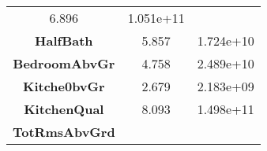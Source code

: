 \documentclass[]{article}
\begin{document}
\begin{longtable}[c]{@{}ccc@{}}
\begin{minipage}[t]{0.16\columnwidth}
6.896
\strut\end{minipage} &
\begin{minipage}[t]{0.19\columnwidth}\centering\strut
1.051e+11
\strut\end{minipage}\tabularnewline
\begin{minipage}[t]{0.25\columnwidth}\centering\strut
\textbf{HalfBath}
\strut\end{minipage} &
\begin{minipage}[t]{0.16\columnwidth}\centering\strut
5.857
\strut\end{minipage} &
\begin{minipage}[t]{0.19\columnwidth}\centering\strut
1.724e+10
\strut\end{minipage}\tabularnewline
\begin{minipage}[t]{0.25\columnwidth}\centering\strut
\textbf{BedroomAbvGr}
\strut\end{minipage} &
\begin{minipage}[t]{0.16\columnwidth}\centering\strut
4.758
\strut\end{minipage} &
\begin{minipage}[t]{0.19\columnwidth}\centering\strut
2.489e+10
\strut\end{minipage}\tabularnewline
\begin{minipage}[t]{0.25\columnwidth}\centering\strut
\textbf{Kitche0bvGr}
\strut\end{minipage} &
\begin{minipage}[t]{0.16\columnwidth}\centering\strut
2.679
\strut\end{minipage} &
\begin{minipage}[t]{0.19\columnwidth}\centering\strut
2.183e+09
\strut\end{minipage}\tabularnewline
\begin{minipage}[t]{0.25\columnwidth}\centering\strut
\textbf{KitchenQual}
\strut\end{minipage} &
\begin{minipage}[t]{0.16\columnwidth}\centering\strut
8.093
\strut\end{minipage} &
\begin{minipage}[t]{0.19\columnwidth}\centering\strut
1.498e+11
\strut\end{minipage}\tabularnewline
\begin{minipage}[t]{0.25\columnwidth}\centering\strut
\textbf{TotRmsAbvGrd}
\strut\end{minipage} &
\begin{minipage}[t]{0.16\columnwidth}\centering\strut

\end{minipage}
\end{longtable}
\end{document}
